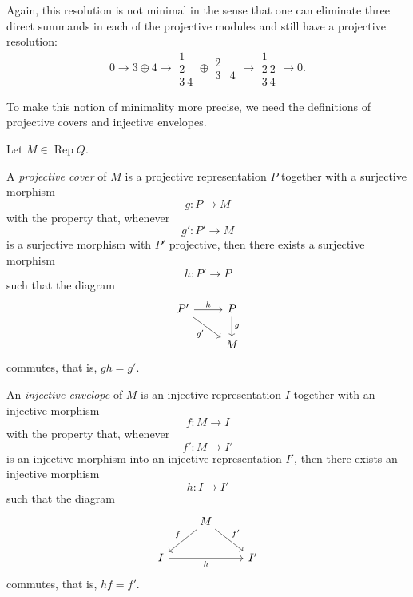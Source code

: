 \documentclass[11pt, a4paper]{report}
\begin{document}
\begin{example}
    Again, this resolution is not minimal in the sense that one can eliminate three direct
    summands in each of the projective modules and still have a projective resolution:
    \[
    0 \longrightarrow
    3 \oplus 4
    \longrightarrow
    \begin{matrix}
    1\\
    2\\
    3\ 4
    \end{matrix}
    \oplus
 \begin{matrix} 2  \\ 3&4 \end{matrix}
    \longrightarrow
    \begin{matrix}
    1\\
    2\ 2\\
    3\ 4
    \end{matrix}
    \longrightarrow 0.
    \]

    To make this notion of minimality more precise, we need the definitions of
    projective covers and injective envelopes.
    \end{example}

    \begin{definition}
        Let $M \in \operatorname{Rep}Q$.

        A \emph{projective cover} of $M$ is a projective representation $P$ together with a surjective morphism
        \[
        g \colon P \to M
        \]
        with the property that, whenever
        \[
        g' \colon P' \to M
        \]
        is a surjective morphism with $P'$ projective, then there exists a surjective morphism
        \[
        h \colon P' \to P
        \]
        such that the diagram
        \[
        \begin{tikzcd}
        P' \arrow[dr, "g'"'] \arrow[r, "h"] & P \arrow[d, "g"] \\
        & M
        \end{tikzcd}
        \]
        commutes, that is, $gh=g'$.

        An \emph{injective envelope} of $M$ is an injective representation $I$ together with an injective morphism
        \[
        f \colon M \to I
        \]
        with the property that, whenever
        \[
        f' \colon M \to I'
        \]
        is an injective morphism into an injective representation $I'$, then there exists an injective morphism
        \[
        h \colon I \to I'
        \]
        such that the diagram
        \[
        \begin{tikzcd}
        & M \arrow[dl, "f"'] \arrow[dr, "f'"] & \\
        I \arrow[rr, "h"'] & & I'
        \end{tikzcd}
        \]
        commutes, that is, $hf=f'$.
        \end{definition}
\end{document}
